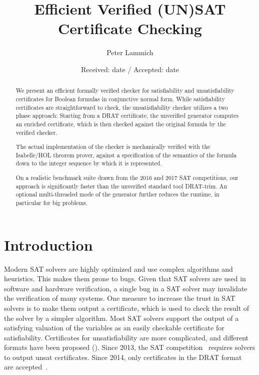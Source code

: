 \documentclass[smallcondensed]{svjour3}     %
\begin{document}
\title{Efficient Verified (UN)SAT Certificate Checking}

\author{Peter Lammich}


\date{Received: date / Accepted: date}

\maketitle

\begin{abstract}
We present an efficient formally verified checker for satisfiability and unsatisfiability certificates for 
Boolean formulas in conjunctive normal form. 
While satisfiability certificates are straightforward to check, the unsatisfiability checker utilizes a two phase approach: 
Starting from a DRAT certificate, the unverified generator computes an enriched certificate,
which is then checked against the original formula by the verified checker.

The actual implementation of the checker is mechanically verified with the Isabelle/HOL theorem prover, 
against a specification of the semantics of the formula down to the integer sequence by which it is represented.

On a realistic benchmark suite drawn from the 2016 and 2017 SAT competitions, our approach is significantly faster 
than the unverified standard tool DRAT-trim. An optional multi-threaded mode of the generator further reduces the 
runtime, in particular for big problems.
\end{abstract}




\section{Introduction}
Modern SAT solvers are highly optimized and use complex algorithms and heuristics. This makes them prone to bugs.
Given that SAT solvers are used in software and hardware verification, a single bug in a SAT solver may 
invalidate the verification of many systems.
One measure to increase the trust in SAT solvers is to make them output a certificate, which is used to check 
the result of the solver by a simpler algorithm. 
Most SAT solvers support the output of a satisfying valuation of the variables as an easily checkable certificate for satisfiability.
Certificates for unsatisfiability are more complicated, and different formats have been proposed (\eg \cite{SiBi06,WHH13,WHH14}).
Since 2013, the SAT competition~\cite{satcomp-2013} requires solvers to output unsat certificates.
Since 2014, only certificates in the DRAT format~\cite{WHH14} are accepted~\cite{satcomp-2014}.
\end{document}
